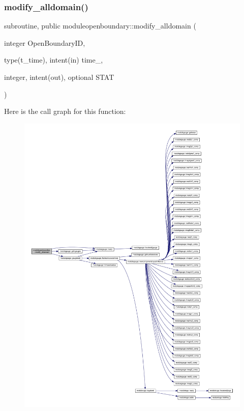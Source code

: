 \subsubsection{\texorpdfstring{modify\+\_\+alldomain()}{modify\_alldomain()}}
{\footnotesize\ttfamily subroutine, public moduleopenboundary\+::modify\+\_\+alldomain (\begin{DoxyParamCaption}\item[{integer}]{Open\+Boundary\+ID,  }\item[{type(t\+\_\+time), intent(in)}]{time\+\_\+,  }\item[{integer, intent(out), optional}]{S\+T\+AT }\end{DoxyParamCaption})}

Here is the call graph for this function\+:\nopagebreak
\begin{figure}[H]
\begin{center}
\leavevmode
\includegraphics[width=350pt]{namespacemoduleopenboundary_aff2a2f4ab16c35a036f9e00575fed103_cgraph}
\end{center}
\end{figure}
\mbox{\label{namespacemoduleopenboundary_ab4eb76c328f66777a2d624134933208e}} 

